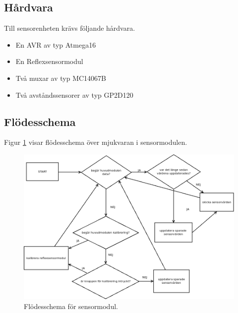 \subsection{Hårdvara}
Till sensorenheten krävs följande hårdvara.
\begin{itemize}
\item{En AVR av typ Atmega16}
\item{En Reflexsensormodul}
\item{Två muxar av typ MC14067B}
\item{Två avståndssensorer av typ GP2D120}
\end{itemize}


\subsection{Flödesschema}
Figur \ref{systemskiss:sensorschema} visar flödesschema över mjukvaran i sensormodulen.

\begin{figure}[h]
\center
\includegraphics[scale=0.4]{sensorflow}
\caption{Flödesschema för sensormodul.} \label{systemskiss:sensorschema}
\end{figure}


%
